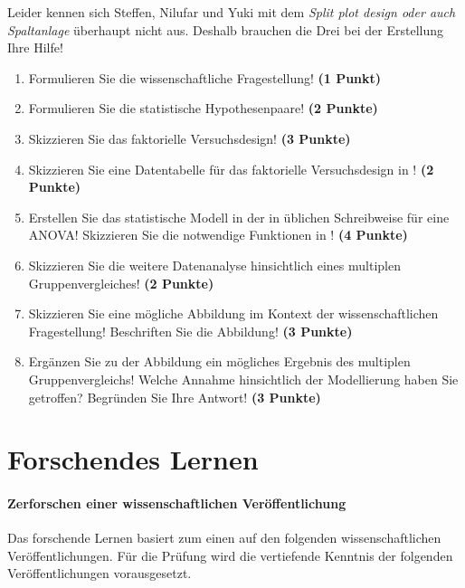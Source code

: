 \documentclass[a4paper, 9pt]{scrartcl}\usepackage[]{graphicx}\usepackage[]{xcolor}
\begin{document}
Leider kennen sich Steffen, Nilufar und Yuki mit dem \textit{Split plot design oder auch Spaltanlage} überhaupt nicht aus. Deshalb brauchen die Drei bei der Erstellung Ihre Hilfe!

\begin{enumerate}
  \setcounter{enumi}{0}
  \item Formulieren Sie die wissenschaftliche Fragestellung! \textbf{(1 Punkt)}
  \item Formulieren Sie die statistische Hypothesenpaare! \textbf{(2 Punkte)}
  \item Skizzieren Sie das faktorielle Versuchsdesign! \textbf{(3 Punkte)}
  \item Skizzieren Sie eine Datentabelle für das faktorielle Versuchsdesign in \Rlogo! \textbf{(2 Punkte)}
  \item Erstellen Sie das statistische Modell in der in \Rlogo üblichen Schreibweise für eine ANOVA! Skizzieren Sie die notwendige Funktionen in \Rlogo! \textbf{(4 Punkte)}
  \item Skizzieren Sie die weitere Datenanalyse hinsichtlich eines multiplen Gruppenvergleiches! \textbf{(2 Punkte)}
  \item Skizzieren Sie eine mögliche Abbildung im Kontext der wissenschaftlichen Fragestellung! Beschriften Sie die Abbildung! \textbf{(3 Punkte)}
  \item Ergänzen Sie zu der Abbildung ein mögliches Ergebnis des multiplen Gruppenvergleichs! Welche Annahme hinsichtlich der Modellierung haben Sie getroffen? Begründen Sie Ihre Antwort! \textbf{(3 Punkte)}
\end{enumerate} 
\clearpage
\part{Forschendes Lernen}

\subsection*{Zerforschen einer wissenschaftlichen Veröffentlichung}

Das forschende Lernen basiert zum einen auf den folgenden wissenschaftlichen Veröffentlichungen. Für die Prüfung wird die vertiefende Kenntnis der folgenden Veröffentlichungen vorausgesetzt.\\
\end{document}
